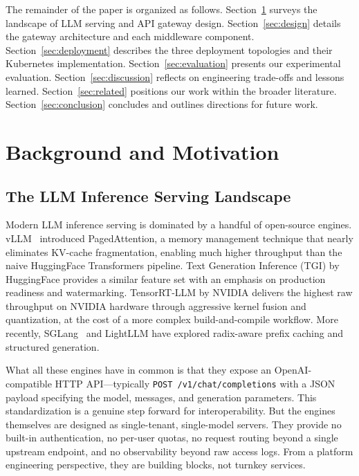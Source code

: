 \documentclass[10pt,journal]{IEEEtran}
\begin{document}
The remainder of the paper is organized as follows. Section~\ref{sec:background} surveys the landscape of LLM serving and API gateway design. Section~\ref{sec:design} details the gateway architecture and each middleware component. Section~\ref{sec:deployment} describes the three deployment topologies and their Kubernetes implementation. Section~\ref{sec:evaluation} presents our experimental evaluation. Section~\ref{sec:discussion} reflects on engineering trade-offs and lessons learned. Section~\ref{sec:related} positions our work within the broader literature. Section~\ref{sec:conclusion} concludes and outlines directions for future work.

\section{Background and Motivation}\label{sec:background}

\subsection{The LLM Inference Serving Landscape}

Modern LLM inference serving is dominated by a handful of open-source engines. vLLM~\cite{kwon2023efficient} introduced PagedAttention, a memory management technique that nearly eliminates KV-cache fragmentation, enabling much higher throughput than the naive HuggingFace Transformers pipeline. Text Generation Inference (TGI) by HuggingFace provides a similar feature set with an emphasis on production readiness and watermarking. TensorRT-LLM by NVIDIA delivers the highest raw throughput on NVIDIA hardware through aggressive kernel fusion and quantization, at the cost of a more complex build-and-compile workflow. More recently, SGLang~\cite{zheng2024sglang} and LightLLM have explored radix-aware prefix caching and structured generation.

What all these engines have in common is that they expose an OpenAI-compatible HTTP API---typically \texttt{POST /v1/chat/completions} with a JSON payload specifying the model, messages, and generation parameters. This standardization is a genuine step forward for interoperability. But the engines themselves are designed as single-tenant, single-model servers. They provide no built-in authentication, no per-user quotas, no request routing beyond a single upstream endpoint, and no observability beyond raw access logs. From a platform engineering perspective, they are building blocks, not turnkey services.
\end{document}
